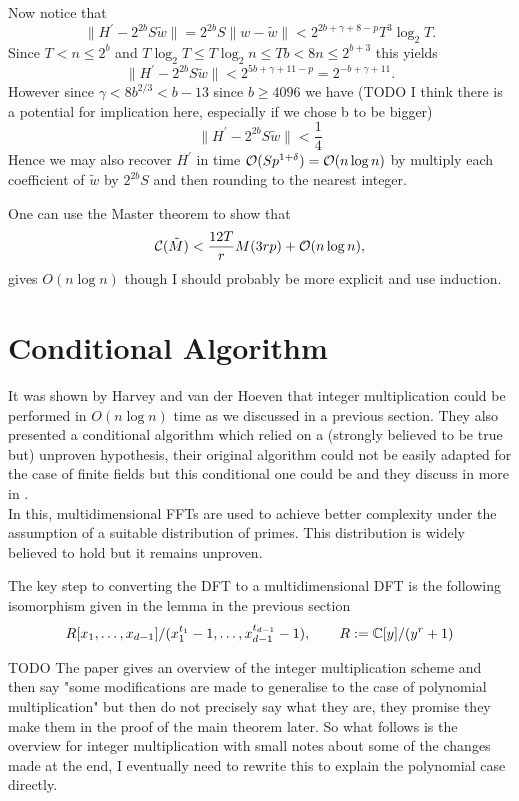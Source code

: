 Now notice that
\[
    \|H^\prime - 2^{2b}S\tilde{w}\| = 2^{2b}S\|w - \tilde{w}\| < 2^{2b + \gamma + 8 - p} T^3 \log_2 T.
\]
Since $T < n \le 2^b$ and $T \log _2 T \le T \log_2 n \le Tb < 8n \le 2^{b+3}$ this yields
\[
    \|H^\prime - 2^{2b}S\tilde{w}\| < 2^{5b + \gamma + 11 - p} = 2^{-b + \gamma + 11}.
\]
However since $\gamma < 8b^{2/3} < b - 13$ since $b \ge 4096$ we have (TODO I think there is a potential for implication here, especially if we chose b to be bigger)
\[
    \| H^\prime - 2^{2b}S \tilde{w} \| < \frac{1}{4}
\]
Hence we may also recover $H^\prime$ in time $\mathcal O(Sp^{1 + \delta}) = \mathcal O(n \log n)$ by multiply each coefficient of $\tilde{w}$ by $2^{2b}S$ and then rounding to the nearest integer.

One can use the Master theorem to show that
    \[
        \mathcal C(\tilde{M}) < \frac{12T}{r} M(3rp) + \mathcal O(n \log n),
    \]
gives $O(n \log n)$ though I should probably be more explicit and use induction.

\newpage

\section{Conditional Algorithm}

It was shown by Harvey and van der Hoeven \cite{nlogn} that integer multiplication could be performed in $O(n\log n)$ time as we discussed in a previous section. They also presented a conditional algorithm which relied on a (strongly believed to be true but) unproven hypothesis, their original algorithm could not be easily adapted for the case of finite fields but this conditional one could be and they discuss in more in \cite{ffnlogn}.\\
In this, multidimensional FFTs are used to achieve better complexity under the assumption of a suitable distribution of primes. This distribution is widely believed to hold but it remains unproven.

The key step to converting the DFT to a multidimensional DFT is the following isomorphism given in the lemma in the previous section
\begin{equation}\label{eq:here}
    R[x_1, \ldots, x_{d-1}] / (x_1^{t_1} - 1, \ldots, x_{d-1}^{t_{d-1}} - 1), \qquad R := {\mathbb C}[y]/(y^r + 1)
\end{equation}

TODO The paper gives an overview of the integer multiplication scheme and then say "some modifications are made to generalise to the case of polynomial multiplication" but then do not precisely say what they are, they promise they make them in the proof of the main theorem later. So what follows is the overview for integer multiplication with small notes about some of the changes made at the end, I eventually need to rewrite this to explain the polynomial case directly.
\medskip

